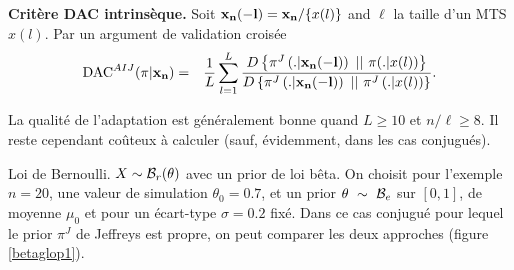 \begin{definition}{\bf Critère DAC intrinsèque.}
Soit
${\bf x_n(-l)}={\bf x_n}/\{x(l)\}$ and $\ell$ la taille d'un MTS
$x(l)$. Par un argument de validation croisée
\begin{eqnarray*}
\mbox{DAC}^{AIJ}(\pi|{\bf x_n}) & = & \frac{1}{L} \sum\limits_{l=1}^L
\frac{D\left\{\pi^J\left(.|{\bf x_n(-l)}\right) \ || \
\pi(.|x(l))\right\}}{ D\left\{\pi^J\left(.|{\bf x_n(-l)}\right) \
|| \ \pi^J\left(.|x(l)\right)\right\}}.\label{cohAIJ}
\end{eqnarray*}
\end{definition}

La qualité de l'adaptation est généralement bonne quand $L\geq 10$ et $n/\ell\geq 8$. Il reste cependant coûteux à calculer (sauf, évidemment, dans les cas conjugués). \\

\begin{exo}{Loi de Bernoulli.}\label{exo.bernoulli}
$X\sim {\cal{B}}_r(\theta)$ avec un prior de loi bêta. On choisit pour l'exemple $n=20$, une valeur de simulation 
$\theta_0=0.7$, et un prior $\theta \ \sim \ {\cal{B}}_e$ sur $[0,1]$, de moyenne
$\mu_0$ et pour un écart-type $\sigma=0.2$ fixé. Dans ce cas conjugué pour lequel le prior $\pi^J$ de Jeffreys est propre, on peut comparer les deux approches (figure \ref{betaglop1}). \\
\end{exo}


